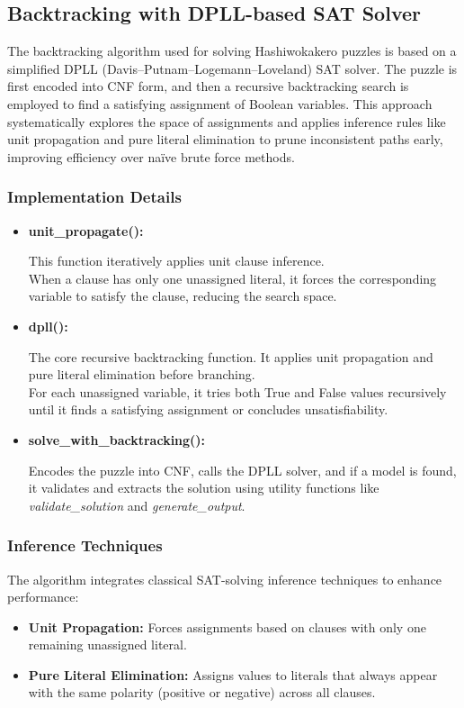 \subsection{Backtracking with DPLL-based SAT Solver}
\noindent The backtracking algorithm used for solving Hashiwokakero puzzles is based on a simplified DPLL (Davis–Putnam–Logemann–Loveland) SAT solver. The puzzle is first encoded into CNF form, and then a recursive backtracking search is employed to find a satisfying assignment of Boolean variables. This approach systematically explores the space of assignments and applies inference rules like unit propagation and pure literal elimination to prune inconsistent paths early, improving efficiency over naïve brute force methods.

\subsubsection{Implementation Details}
\begin{itemize}
	\item \textbf{unit\_propagate():}
	      \begin{flushleft}
		      This function iteratively applies unit clause inference.\\ When a clause has only one unassigned literal, it forces the corresponding variable to satisfy the clause, reducing the search space.
	      \end{flushleft}
	\item \textbf{dpll():}
	      \begin{flushleft}
		      The core recursive backtracking function. It applies unit propagation and pure literal elimination before branching.\\ For each unassigned variable, it tries both True and False values recursively until it finds a satisfying assignment or concludes unsatisfiability.
	      \end{flushleft}
	\item \textbf{solve\_with\_backtracking():}
	      \begin{flushleft}
		      Encodes the puzzle into CNF, calls the DPLL solver, and if a model is found, it validates and extracts the solution using utility functions like \textit{validate\_solution} and \textit{generate\_output}.
	      \end{flushleft}
\end{itemize}

\subsubsection{Inference Techniques} The algorithm integrates classical SAT-solving inference techniques to enhance performance:
\begin{itemize}
	\item \textbf{Unit Propagation:} Forces assignments based on clauses with only one remaining unassigned literal.
	\item \textbf{Pure Literal Elimination:} Assigns values to literals that always appear with the same polarity (positive or negative) across all clauses.
\end{itemize}


